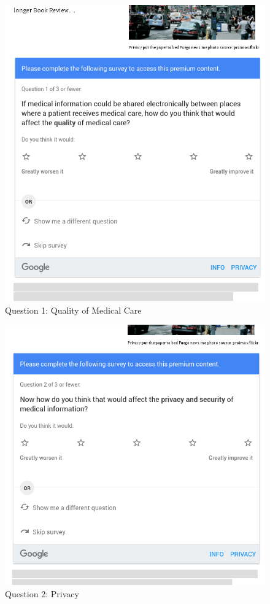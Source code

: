 \begin{figure}
\includegraphics[width=\textwidth]{Selection_351.png}
\caption{\label{fig:q1}Question 1: Quality of Medical Care}
\end{figure}
\begin{figure}
	\includegraphics[width=\textwidth]{Selection_352.png}
	\caption{\label{fig:q2}Question 2: Privacy}
\end{figure}
